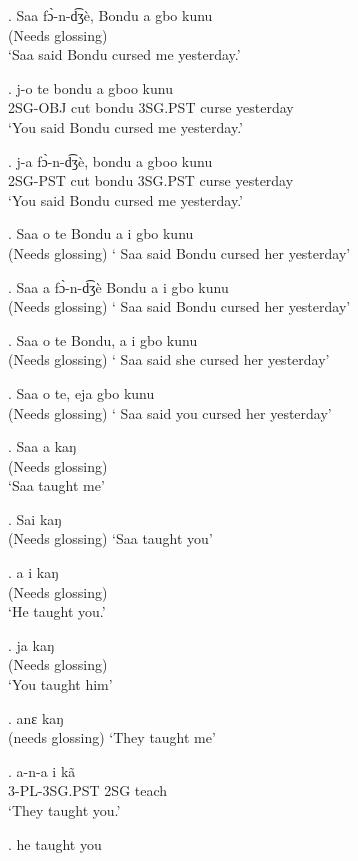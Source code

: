 \documentclass{assets/fieldnotes}
\begin{document}
\exg. Saa fɔ̀-n-d͡ʒè, Bondu a gbo kunu\\
(Needs glossing)\\
`Saa said Bondu cursed me yesterday.'

\exg. j-o te bondu a gboo kunu \\
2SG-OBJ cut bondu 3SG.PST curse yesterday \\
`You said Bondu cursed me yesterday.'

\exg. j-a fɔ̀-n-d͡ʒè, bondu a gboo kunu \\
2SG-PST cut bondu 3SG.PST curse yesterday \\
`You said Bondu cursed me yesterday.'

\exg. Saa o te Bondu a i gbo kunu\\
(Needs glossing)
` Saa said Bondu cursed her yesterday'

\exg. Saa a fɔ̀-n-d͡ʒè Bondu a i gbo kunu\\
(Needs glossing)
` Saa said Bondu cursed her yesterday'

\exg. Saa o te Bondu, a i gbo kunu\\
(Needs glossing)
` Saa said she cursed her yesterday'

\exg. Saa o te, eja gbo kunu\\
(Needs glossing)
` Saa said you cursed her yesterday'



\exg. Saa a kaŋ \\
(Needs glossing)\\
`Saa taught me'

\exg. Sai kaŋ\\
(Needs glossing)
`Saa taught you'

\exg. a i kaŋ\\
(Needs glossing)\\
`He taught you.'

\exg. ja kaŋ\\
(Needs glossing)\\
`You taught him'

\exg. anɛ kaŋ\\
(needs glossing)
`They taught me'


\exg. a-n-a i kã \\
3-PL-3SG.PST 2SG teach \\
`They taught you.'

\ex. he taught you


\end{document}
